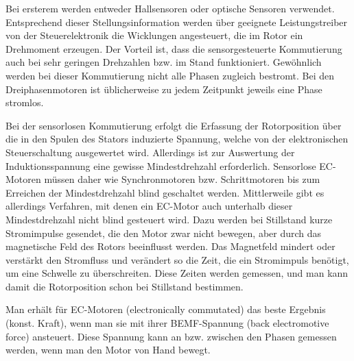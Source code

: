\begin{description}[leftmargin=3cm]
							\item[Sensorgesteuerte Kommutierung]
							Bei ersterem werden entweder Hallsensoren oder optische Sensoren verwendet.	Entsprechend dieser Stellungsinformation werden über geeignete Leistungstreiber von der Steuerelektronik die Wicklungen angesteuert, die im Rotor ein Drehmoment erzeugen. Der Vorteil ist, dass die sensorgesteuerte Kommutierung auch bei sehr geringen Drehzahlen bzw. im Stand funktioniert. Gewöhnlich werden bei dieser Kommutierung nicht alle Phasen zugleich bestromt. Bei den Dreiphasenmotoren ist üblicherweise zu jedem Zeitpunkt jeweils eine Phase stromlos.
							
							\item[Sensorlose Kommutierung]
							Bei der sensorlosen Kommutierung erfolgt die Erfassung der Rotorposition über die in den Spulen des Stators induzierte Spannung, welche von der elektronischen Steuerschaltung ausgewertet wird. Allerdings ist zur Auswertung der Induktionsspannung eine gewisse Mindestdrehzahl erforderlich. Sensorlose EC-Motoren müssen daher wie Synchronmotoren bzw. Schrittmotoren bis zum Erreichen der Mindestdrehzahl blind geschaltet werden.
							Mittlerweile gibt es allerdings Verfahren, mit denen ein EC-Motor auch unterhalb dieser Mindestdrehzahl nicht blind gesteuert wird. Dazu werden bei Stillstand kurze Stromimpulse gesendet, die den Motor zwar nicht bewegen, aber durch das magnetische Feld des Rotors beeinflusst werden. Das Magnetfeld mindert oder verstärkt den Stromfluss und verändert so die Zeit, die ein Stromimpuls benötigt, um eine Schwelle zu überschreiten. Diese Zeiten werden gemessen, und man kann damit die Rotorposition schon bei Stillstand bestimmen.
							
							\item[Geeignetste Kommutierung]
							Man erhält für EC-Motoren (electronically commutated) das beste Ergebnis (konst. Kraft), wenn man sie mit ihrer BEMF-Spannung (back electromotive force) ansteuert. Diese Spannung kann an bzw. zwischen den Phasen gemessen werden, wenn man den Motor von Hand bewegt.
							

\end{description}
